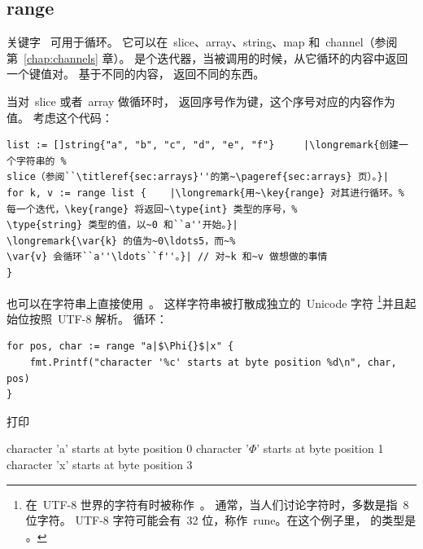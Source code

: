 \subsection{range}
关键字~ 可用于循环。
它可以在~slice、array、string、map 和~channel（参阅第~\ref{chap:channels} 章）。
 是个迭代器，当被调用的时候，从它循环的内容中返回一个键值对。
基于不同的内容， 返回不同的东西。

当对~slice 或者~array 做循环时， 返回序号作为键，这个序号对应的内容作为值。
考虑这个代码：
\begin{lstlisting}
list := []string{"a", "b", "c", "d", "e", "f"}     |\longremark{创建一个字符串的 %
slice（参阅``\titleref{sec:arrays}''的第~\pageref{sec:arrays} 页）。}|
for k, v := range list {	|\longremark{用~\key{range} 对其进行循环。%
每一个迭代，\key{range} 将返回~\type{int} 类型的序号，%
\type{string} 类型的值，以~0 和``a''开始。}|
\longremark{\var{k} 的值为~0\ldots5，而~%
\var{v} 会循环``a''\ldots``f''。}| // 对~k 和~v 做想做的事情
}
\end{lstlisting}
\showremarks

也可以在字符串上直接使用~。
这样字符串被打散成独立的~Unicode 字符
\footnote{在~UTF-8 世界的字符有时被称作~。
通常，当人们讨论字符时，多数是指~8 位字符。
UTF-8 字符可能会有~32 位，称作~rune。在这个例子里， 的类型是 。}并且起始位按照~UTF-8 解析。
循环：
\begin{lstlisting}
for pos, char := range "a|$\Phi{}$|x" {
    fmt.Printf("character '%c' starts at byte position %d\n", char, pos)
}
\end{lstlisting}
打印
\begin{display}
character 'a' starts at byte position 0
character '\begin{math}\Phi\end{math}' starts at byte position 1
character 'x' starts at byte position 3 
\end{display}

